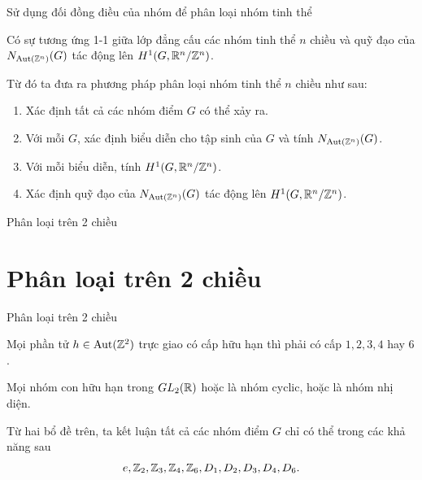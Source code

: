 \begin{frame}{Sử dụng đối đồng điều của nhóm để phân loại nhóm tinh thể}
    \begin{theorem1}
        Có sự tương ứng 1-1 giữa lớp đẳng cấu các nhóm tinh thể $n$ chiều và quỹ đạo của $N_{\operatorname{Aut}(\mathbb Z^n)}(G)$ tác động lên $H^1(G, \mathbb R^n / \mathbb Z^n)$.
    \end{theorem1}
    Từ đó ta đưa ra phương pháp phân loại nhóm tinh thể $n$ chiều như sau:
    \begin{enumerate}
        \item Xác định tất cả các nhóm điểm $G$ có thể xảy ra.
        \item Với mỗi $G$, xác định biểu diễn cho tập sinh của $G$ và tính $N_{\operatorname{Aut}(\mathbb Z^n)}(G)$.
        \item Với mỗi biểu diễn, tính $H^1(G, \mathbb R^n / \mathbb Z^n)$.
        \item Xác định quỹ đạo của $N_{\operatorname{Aut}(\mathbb Z^n)}(G)$ tác động lên $H^1(G, \mathbb R^n / \mathbb Z^n)$.
    \end{enumerate}
\end{frame}

\begin{frame}{Phân loại trên 2 chiều}
    \section{Phân loại trên 2 chiều}
\end{frame}

\begin{frame}{Phân loại trên 2 chiều}
    \begin{proposition}
        Mọi phần tử $h \in \operatorname{Aut}(\mathbb Z^2)$ trực giao có cấp hữu hạn thì phải có cấp $1,2,3,4$ hay $6$.
    \end{proposition}
    \begin{proposition}
        Mọi nhóm con hữu hạn trong $GL_2(\mathbb R)$ hoặc là nhóm cyclic, hoặc là nhóm nhị diện.
    \end{proposition}
    Từ hai bổ đề trên, ta kết luận tất cả các nhóm điểm $G$ chỉ có thể trong các khả năng sau
    $$
        e, \mathbb Z_2, \mathbb Z_3, \mathbb Z_4, \mathbb Z_6, D_1, D_2, D_3, D_4, D_6.
    $$
\end{frame}

